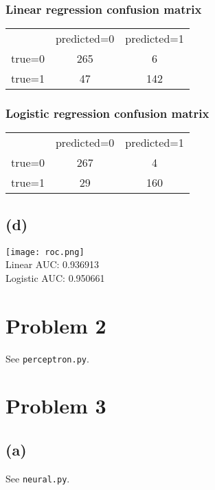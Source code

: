 \documentclass[12pt]{article}
\begin{document}
\subsubsection*{Linear regression confusion matrix}
\begin{tabular}{ r|c|c| }
\multicolumn{1}{r}{}
 &  \multicolumn{1}{c}{predicted=0}
 & \multicolumn{1}{c}{predicted=1} \\
\cline{2-3}
true=0 & 265 & 6 \\
\cline{2-3}
true=1 & 47 & 142 \\
\cline{2-3}
\end{tabular}

\subsubsection*{Logistic regression confusion matrix}
\begin{tabular}{ r|c|c| }
\multicolumn{1}{r}{}
 &  \multicolumn{1}{c}{predicted=0}
 & \multicolumn{1}{c}{predicted=1} \\
\cline{2-3}
true=0 & 267 & 4 \\
\cline{2-3}
true=1 & 29 & 160 \\
\cline{2-3}
\end{tabular}

\subsection*{(d)}
\texttt{[image: roc.png]}
\\ Linear AUC: 0.936913
\\ Logistic AUC: 0.950661

\section*{Problem 2}
See \texttt{perceptron.py}.

\section*{Problem 3}

\subsection*{(a)}
See \texttt{neural.py}.
\end{document}
